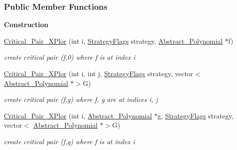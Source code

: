 \subsubsection*{Public Member Functions}
\begin{Indent}\textbf{ Construction}\par
\begin{DoxyCompactItemize}
\item 
\mbox{\label{group___g_b_computation_a056c7e030d1bcb86444bf52405482964}} 
\hyperlink{group___g_b_computation_a056c7e030d1bcb86444bf52405482964}{Critical\+\_\+\+Pair\+\_\+\+X\+Plor} (int i, \hyperlink{group__strategygroup_ga0ee6c8e033547330e6b89929730007f4}{Strategy\+Flags} strategy, \hyperlink{group__polygroup_class_abstract___polynomial}{Abstract\+\_\+\+Polynomial} $\ast$f)
\begin{DoxyCompactList}\small\item\em create critical pair (f,0) where f is at index {\ttfamily i} \end{DoxyCompactList}\item 
\mbox{\label{group___g_b_computation_ab1d6ca591788b357af72ed85f94e4bd5}} 
\hyperlink{group___g_b_computation_ab1d6ca591788b357af72ed85f94e4bd5}{Critical\+\_\+\+Pair\+\_\+\+X\+Plor} (int i, int j, \hyperlink{group__strategygroup_ga0ee6c8e033547330e6b89929730007f4}{Strategy\+Flags} strategy, vector$<$ \hyperlink{group__polygroup_class_abstract___polynomial}{Abstract\+\_\+\+Polynomial} $\ast$$>$G)
\begin{DoxyCompactList}\small\item\em create critical pair (f,g) where f, g are at indices {\ttfamily i}, {\ttfamily j} \end{DoxyCompactList}\item 
\mbox{\label{group___g_b_computation_a01353f6df8dacecfbee9a9cc546fb0cc}} 
\hyperlink{group___g_b_computation_a01353f6df8dacecfbee9a9cc546fb0cc}{Critical\+\_\+\+Pair\+\_\+\+X\+Plor} (int i, \hyperlink{group__polygroup_class_abstract___polynomial}{Abstract\+\_\+\+Polynomial} $\ast$g, \hyperlink{group__strategygroup_ga0ee6c8e033547330e6b89929730007f4}{Strategy\+Flags} strategy, vector$<$ \hyperlink{group__polygroup_class_abstract___polynomial}{Abstract\+\_\+\+Polynomial} $\ast$$>$G)
\begin{DoxyCompactList}\small\item\em create critical pair (f,g) where f is at index {\ttfamily i} \end{DoxyCompactList}\item 

\end{DoxyCompactItemize}
\end{Indent}
